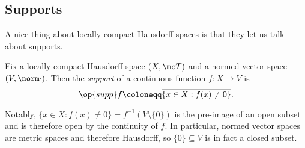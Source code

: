 \documentclass[../notes.tex]{subfiles}
\begin{document}
\subsection{Supports}
A nice thing about locally compact Hausdorff spaces is that they let us talk about supports.
\begin{definition}[Support]
	Fix a locally compact Hausdorff space $(X,\mc T)$ and a normed vector space $(V,\norm\cdot)$. Then the \textit{support} of a continuous function $f\colon X\to V$ is
	\[\op{supp}f\coloneqq\overline{\{x\in X:f(x)\ne0\}}.\]
\end{definition}
Notably, $\{x\in X:f(x)\ne0\}=f^{-1}(V\setminus\{0\})$ is the pre-image of an open subset and is therefore open by the continuity of $f$. In particular, normed vector spaces are metric spaces and therefore Hausdorff, so $\{0\}\subseteq V$ is in fact a closed subset.
\end{document}
